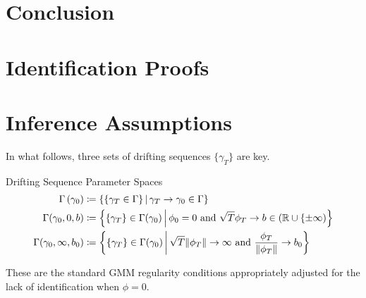 \documentclass[11pt, letterpaper, twoside, final]{article}
\begin{document}
\section{Conclusion}

\clearpage

{}
\printbibliography
\clearpage

\begin{appendices}


\section{Identification Proofs}

\section{Inference Assumptions}

    In what follows, three sets of drifting sequences $\lbrace \gamma_T \rbrace$ are key. 
    
    \begin{defn}{Drifting Sequence Parameter Spaces}
        \begin{align}
            \Gamma\left(\gamma_0\right) &\coloneqq \left\lbrace \left\lbrace \gamma_T \in \Gamma \right\rbrace
            \mvert \gamma_T \to \gamma_0 \in \Gamma \right\rbrace\\ 
            \Gamma(\gamma_0, 0, b) &\coloneqq \left\lbrace \lbrace \gamma_T \rbrace \in \Gamma(\gamma_0) \mvert
            \phi_0 = 0\ \text{and}\ \sqrt{T} \phi_T \to b \in (\R \cup \lbrace \pm \infty) \right\rbrace \\
            \Gamma(\gamma_0, \infty, b_0) &\coloneqq \left\lbrace \lbrace \gamma_T \rbrace \in \Gamma (\gamma_0)
            \mvert \sqrt{T} \norm{\phi_T} \to \infty\ \text{and}\ \frac{\phi_T}{\norm{\phi_T}} \to b_0
            \right\rbrace 
        \end{align}
    \end{defn}
    
    These are the standard GMM regularity conditions appropriately adjusted for the lack of identification when
    $\phi =0$.
    

\end{appendices}
\end{document}
